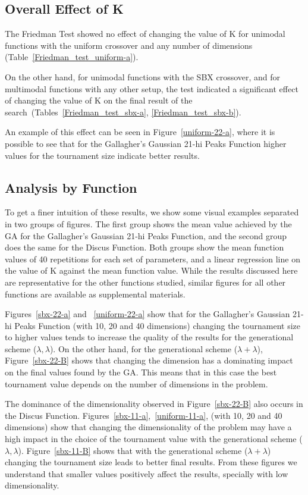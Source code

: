 \subsection{Overall Effect of K}

The Friedman Test showed no effect of changing the value of K
for unimodal functions with the uniform crossover and any
number of dimensions (Table~\ref{Friedman_test_uniform-a}). 

On the other hand, for unimodal functions with the SBX crossover, and
for multimodal functions with any other setup, the test indicated a
significant effect of changing the value of K on the final result of
the search~(Tables~\ref{Friedman_test_sbx-a}, \ref{Friedman_test_sbx-b}). 

An example of this effect can be seen in Figure~\ref{uniform-22-a},
where it is possible to see that for the Gallagher's Gaussian 21-hi
Peaks Function higher values for the tournament size indicate better
results.

\subsection{Analysis by Function}

To get a finer intuition of these results, we show some visual
examples separated in two groups of figures. The first group shows the
mean value achieved by the GA for the Gallagher's Gaussian 21-hi Peaks
Function, and the second group does the same for the Discus
Function. Both groups show the mean function values of 40 repetitions
for each set of parameters, and a linear regression line on the value
of K against the mean function value. While the results discussed here
are representative for the other functions studied, similar figures
for all other functions are available as supplemental materials.

Figures~\ref{sbx-22-a} and ~\ref{uniform-22-a} show that for the
Gallagher's Gaussian 21-hi Peaks Function (with 10, 20 and 40
dimensions) changing the tournament size to higher values tends to
increase the quality of the results for the generational scheme
($\lambda, \lambda$). On the other hand, for the generational scheme
($\lambda + \lambda$), Figure~\ref{sbx-22-B} shows that changing the
dimension has a dominating impact on the final values found by the
GA. This means that in this case the best tournament value depends on
the number of dimensions in the problem.

The dominance of the dimensionality observed in Figure~\ref{sbx-22-B}
also occurs in the Discus Function.
Figures~\ref{sbx-11-a},~\ref{uniform-11-a}, (with 10, 20 and 40
dimensions) show that changing the dimensionality of the problem may
have a high impact in the choice of the tournament value with the
generational scheme ($\lambda, \lambda$). Figure~\ref{sbx-11-B} shows
that with the generational scheme ($\lambda + \lambda$) changing the
tournament size leads to better final results. From these figures we
understand that smaller values positively affect the results,
specially with low dimensionality.

